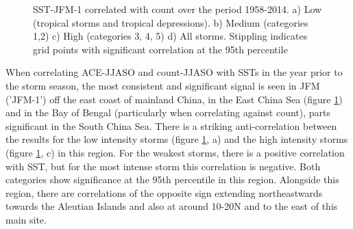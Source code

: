 \begin{figure}
	\centering
	\caption{SST-JFM-1 correlated with count over the period 1958-2014. a) Low (tropical storms and tropical depressions). b) Medium (categories 1,2) c) High (categories 3, 4, 5) d) All storms. Stippling indicates grid points with significant correlation at the 95th percentile} \label{fig:corr_prevJFM} 
\end{figure} 

When correlating ACE-JJASO and count-JJASO with SSTs in the year prior to the storm season, the most consistent and significant signal is seen in JFM ('JFM-1') off the east coast of mainland China, in the East China Sea (figure \ref{fig:corr_prevJFM}) and in the Bay of Bengal (particularly when correlating against count), parts significant in the South China Sea. There is a striking anti-correlation between the results for the low intensity storms (figure \ref{fig:corr_prevJFM}, a) and the high intensity storms (figure \ref{fig:corr_prevJFM}, c) in this region. For the weakest storms, there is a positive correlation with SST, but for the most intense storm this correlation is negative. Both categories show significance at the 95th percentile in this region.  Alongside this region, there are correlations of the opposite sign extending northeastwards towards the Aleutian Islands and also at around 10-20N and to the east of this main site.


